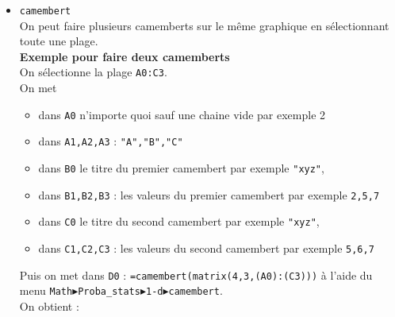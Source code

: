 \documentclass[a4paper,11pt]{book}
\begin{document}
\begin{itemize}
\item {\tt camembert}\\
On peut faire plusieurs camemberts sur le m\^eme graphique en s\'electionnant 
toute une plage.\\
 {\bf Exemple pour faire deux camemberts}\\
On s\'electionne la plage {\tt A0:C3}.\\
On met 
\begin{itemize}
\item dans {\tt A0} n'importe quoi sauf une chaine vide par exemple 2
\item dans {\tt A1,A2,A3} : {\tt "A","B","C"}\\
\item dans {\tt B0} le titre du premier camembert par exemple {\tt "xyz"},\\
\item dans {\tt B1,B2,B3} : les valeurs du premier camembert par exemple 
{\tt 2,5,7}\\
\item dans {\tt C0} le titre du second camembert par exemple {\tt "xyz"},\\
\item dans {\tt C1,C2,C3} : les valeurs du second camembert par exemple 
{\tt 5,6,7}
\end{itemize}
Puis on met dans {\tt D0} : {\tt =camembert(matrix(4,3,(A0):(C3)))} \`a l'aide 
du menu {\tt Math$\blacktriangleright$Proba\_stats$\blacktriangleright$1-d$\blacktriangleright$camembert}.\\
On obtient :
\begin{center}\end{center}

\end{itemize}
\end{document}
